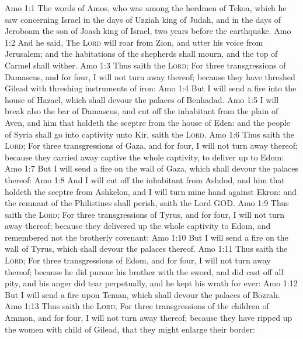 \vs Amo 1:1 The words of Amos, who was among the herdmen of Tekoa, which he saw concerning Israel in the days of Uzziah king of Judah, and in the days of Jeroboam the son of Joash king of Israel, two years before the earthquake.
\vs Amo 1:2 And he said, The \textsc{Lord} will roar from Zion, and utter his voice from Jerusalem; and the habitations of the shepherds shall mourn, and the top of Carmel shall wither.
\vs Amo 1:3 Thus saith the \textsc{Lord}; For three transgressions of Damascus, and for four, I will not turn away  thereof; because they have threshed Gilead with threshing instruments of iron:
\vs Amo 1:4 But I will send a fire into the house of Hazael, which shall devour the palaces of Benhadad.
\vs Amo 1:5 I will break also the bar of Damascus, and cut off the inhabitant from the plain of Aven, and him that holdeth the sceptre from the house of Eden: and the people of Syria shall go into captivity unto Kir, saith the \textsc{Lord}.
\vs Amo 1:6 Thus saith the \textsc{Lord}; For three transgressions of Gaza, and for four, I will not turn away  thereof; because they carried away captive the whole captivity, to deliver  up to Edom:
\vs Amo 1:7 But I will send a fire on the wall of Gaza, which shall devour the palaces thereof:
\vs Amo 1:8 And I will cut off the inhabitant from Ashdod, and him that holdeth the sceptre from Ashkelon, and I will turn mine hand against Ekron: and the remnant of the Philistines shall perish, saith the Lord GOD.
\vs Amo 1:9 Thus saith the \textsc{Lord}; For three transgressions of Tyrus, and for four, I will not turn away  thereof; because they delivered up the whole captivity to Edom, and remembered not the brotherly covenant:
\vs Amo 1:10 But I will send a fire on the wall of Tyrus, which shall devour the palaces thereof.
\vs Amo 1:11 Thus saith the \textsc{Lord}; For three transgressions of Edom, and for four, I will not turn away  thereof; because he did pursue his brother with the sword, and did cast off all pity, and his anger did tear perpetually, and he kept his wrath for ever:
\vs Amo 1:12 But I will send a fire upon Teman, which shall devour the palaces of Bozrah.
\vs Amo 1:13 Thus saith the \textsc{Lord}; For three transgressions of the children of Ammon, and for four, I will not turn away  thereof; because they have ripped up the women with child of Gilead, that they might enlarge their border:
